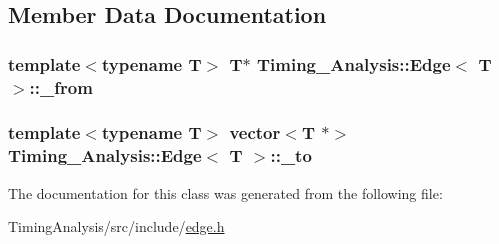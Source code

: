 \subsection{Member Data Documentation}
\hypertarget{classTiming__Analysis_1_1Edge_a718ef7f37c4d9ddf867ef15eaa96ae43}{
\subsubsection[{\-\_\-from}]{\setlength{\rightskip}{0pt plus 5cm}template$<$typename T$>$ T$\ast$ {\bf Timing\-\_\-\-Analysis\-::\-Edge}$<$ T $>$\-::\-\_\-from\hspace{0.3cm}{\ttfamily [protected]}}}\label{classTiming__Analysis_1_1Edge_a718ef7f37c4d9ddf867ef15eaa96ae43}
\hypertarget{classTiming__Analysis_1_1Edge_ae1bc9c1f6a84a2b4a116d5c4571fba02}{
\subsubsection[{\-\_\-to}]{\setlength{\rightskip}{0pt plus 5cm}template$<$typename T$>$ vector$<$T $\ast$$>$ {\bf Timing\-\_\-\-Analysis\-::\-Edge}$<$ T $>$\-::\-\_\-to\hspace{0.3cm}{\ttfamily [protected]}}}\label{classTiming__Analysis_1_1Edge_ae1bc9c1f6a84a2b4a116d5c4571fba02}


The documentation for this class was generated from the following file\-:\begin{DoxyCompactItemize}
\item 
Timing\-Analysis/src/include/\hyperlink{edge_8h}{edge.\-h}\end{DoxyCompactItemize}
